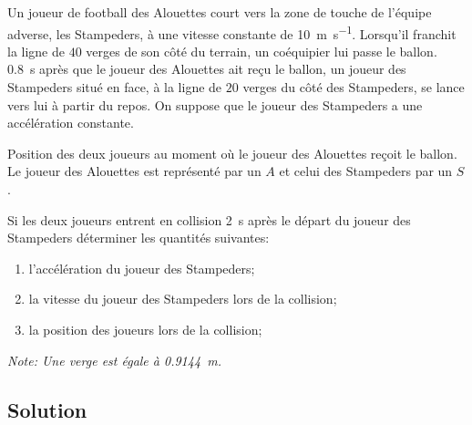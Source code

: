 \documentclass{tufte-handout}
\begin{document}
Un joueur de football des Alouettes court vers la zone de touche de l'équipe
adverse, les Stampeders, à une vitesse constante de \SI{10}{\meter\per\second}.
Lorsqu'il franchit la ligne de $40$ verges de son côté du terrain, un
coéquipier lui passe le ballon.  \SI{0.8}{\second} après que le joueur des
Alouettes ait reçu le ballon, un joueur des Stampeders situé en face, à la
ligne de $20$ verges du côté des Stampeders, se lance vers lui à partir du
repos.  On suppose que le joueur des Stampeders a une accélération constante.

\begin{marginfigure}
  \caption{Position des deux joueurs au moment où le joueur des Alouettes
    reçoit le ballon.  Le joueur des Alouettes est représenté par un $A$ et
    celui des Stampeders par un $S$.}
  \label{fig:football}
\end{marginfigure}

Si les deux joueurs entrent en collision \SI{2}{\second} après le départ du
joueur des Stampeders déterminer les quantités suivantes:

\begin{enumerate}
  \item l'accélération du joueur des Stampeders;
  \item la vitesse du joueur des Stampeders lors de la collision;
  \item la position des joueurs lors de la collision;
\end{enumerate}

\textit{Note: Une verge est égale à \SI{0.9144}{\meter}.}

\subsection{Solution}
\end{document}
